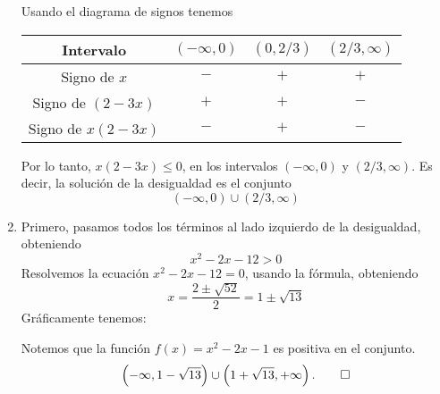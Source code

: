 \documentclass[11pt,a4]{aleph-examen}
\begin{document}
\begin{preguntas}
\begin{respuesta}
\begin{enumerate}[label=\textit{\alph*)}]
        Usando el diagrama de signos tenemos
        \begin{center}
            \begin{tabular}{c|c|c|c}
                Intervalo & $(-\infty,0)$ & $(0,2/3)$ & $(2/3, \infty)$  \\ \hline
                Signo de $x$ & $-$ & $+$ & $+$ \\
                Signo de $(2-3x)$ & $+$ & $+$ & $-$ \\ \hline
                Signo de $x(2-3x)$ & $-$ & $+$ & $-$ \\
            \end{tabular}
        \end{center}
        Por lo tanto, $x(2-3x) \leq 0$, en los intervalos $(-\infty,0)$ y $(2/3, \infty)$. Es decir, la solución de la desigualdad es el conjunto
        $$
        (-\infty,0) \cup (2/3, \infty)
        $$
        \item Primero, pasamos todos los términos al lado izquierdo de la desigualdad, obteniendo
        $$
        x^2 - 2x - 12 > 0
        $$
        Resolvemos la ecuación $x^2 - 2x - 12 = 0$, usando la fórmula, obteniendo
        $$
        x = \frac{2 \pm \sqrt{52}}{2} = 1 \pm \sqrt{13}
        $$
        Gráficamente tenemos:
        \begin{center}
        \end{center}
        Notemos que la función $f(x) = x^2 - 2x - 1$ es positiva en el conjunto.
        \[
        \left(-\infty,1 - \sqrt{13}\right) \cup \left(1 + \sqrt{13}, +\infty\right).\qedhere
        \]
    \end{enumerate}
\end{respuesta}
\end{preguntas}
\end{document}
